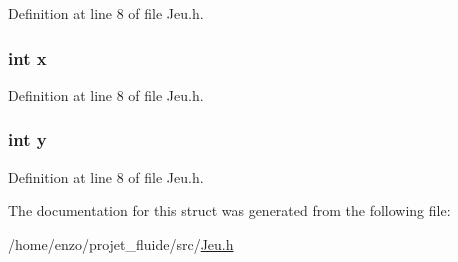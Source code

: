 Definition at line 8 of file Jeu.\-h.

\hypertarget{struct_projectile_a6150e0515f7202e2fb518f7206ed97dc}{
\subsubsection[{x}]{\setlength{\rightskip}{0pt plus 5cm}int x}}\label{struct_projectile_a6150e0515f7202e2fb518f7206ed97dc}


Definition at line 8 of file Jeu.\-h.

\hypertarget{struct_projectile_a0a2f84ed7838f07779ae24c5a9086d33}{
\subsubsection[{y}]{\setlength{\rightskip}{0pt plus 5cm}int y}}\label{struct_projectile_a0a2f84ed7838f07779ae24c5a9086d33}


Definition at line 8 of file Jeu.\-h.



The documentation for this struct was generated from the following file\-:\begin{DoxyCompactItemize}
\item 
/home/enzo/projet\-\_\-fluide/src/\hyperlink{_jeu_8h}{Jeu.\-h}\end{DoxyCompactItemize}

